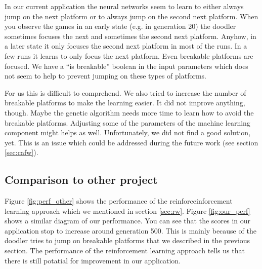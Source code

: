 \documentclass[a4paper,12pt,pagesize,headsepline,bibtotoc,titlepage,abstracton]{scrartcl}
\begin{document}
In our current application the neural networks seem to learn to either always jump on the next platform or to always jump on the second next platform. When you observe the games in an early state (e.g. in generation 20) the doodler sometimes focuses the next and sometimes the second next platform. Anyhow, in a later state it only focuses the second next platform in most of the runs. In a few runs it learns to only focus the next platform. Even breakable platforms are focused. We have a ``is breakable'' boolean in the input parameters which does not seem to help to prevent jumping on these types of platforms.

For us this is difficult to comprehend. We also tried to increase the number of breakable platforms to make the learning easier. It did not improve anything, though. Maybe the genetic algorithm needs more time to learn how to avoid the breakable platforms. Adjusting some of the parameters of the machine learning component might helps as well. Unfortunately, we did not find a good solution, yet. This is an issue which could be addressed during the future work (see section \ref{sec:cafw}).

\subsection{Comparison to other project}

Figure \ref{fig:perf_other} shows the performance of the reinforceinforcement learning approach which we mentioned in section \ref{sec:rw}. Figure \ref{fig:our_perf} shows a similar diagram of our performance. You can see that the scores in our application stop to increase around generation 500. This is mainly because of the doodler tries to jump on breakable platforms that we described in the previous section. The performance of the reinforcement learning approach tells us that there is still potatial for improvement in our application.
\end{document}
